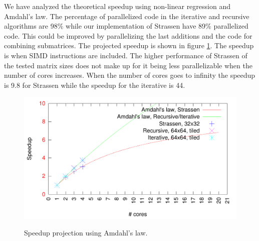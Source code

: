 We have analyzed the theoretical speedup using non-linear regression and Amdahl's law. The percentage of parallelized code in the iterative and recursive algorithms are 98\% while our implementation of Strassen have 89\% parallelized code. This could be improved by parallelizing the last additions and the code for combining submatrices. The projected speedup is shown in figure \ref{fig:amdahl}. The speedup is when SIMD instructions are included. The higher performance of Strassen of the tested matrix sizes does not make up for it being less parallelizable when the number of cores increases. When the number of cores goes to infinity the speedup is 9.8 for Strassen while the speedup for the iterative is 44.


\begin{figure}[h!]
  \centering
  \includegraphics[width=\textwidth]{"../project2/gnuplots/amdahl"}
  \label{fig:amdahl}
  \caption{Speedup projection using Amdahl's law.}
\end{figure}
